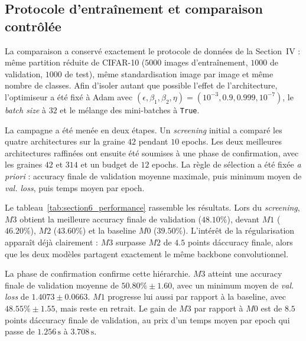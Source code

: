 \subsection{Protocole d'entra\^inement et comparaison contr\^ol\'ee}
La comparaison a conserv\'e exactement le protocole de donn\'ees de la Section~IV : m\^eme partition r\'eduite de CIFAR-10 ($5000$ images d'entra\^inement, $1000$ de validation, $1000$ de test), m\^eme standardisation image par image et m\^eme nombre de classes. Afin d'isoler autant que possible l'effet de l'architecture, l'optimiseur a \'et\'e fix\'e \`a Adam avec $(\epsilon,\beta_1,\beta_2,\eta)=(10^{-3},0.9,0.999,10^{-7})$, le \textit{batch size} \`a $32$ et le m\'elange des mini-batches \`a \texttt{True}.

La campagne a \'et\'e men\'ee en deux \'etapes. Un \textit{screening} initial a compar\'e les quatre architectures sur la graine $42$ pendant $10$ epochs. Les deux meilleures architectures raffin\'ees ont ensuite \'et\'e soumises \`a une phase de confirmation, avec les graines $42$ et $314$ et un budget de $12$ epochs. La r\`egle de s\'election a \'et\'e fix\'ee \textit{a priori} : accuracy finale de validation moyenne maximale, puis minimum moyen de \textit{val. loss}, puis temps moyen par epoch.

Le tableau~\ref{tab:section6_performance} rassemble les r\'esultats. Lors du \textit{screening}, $M3$ obtient la meilleure accuracy finale de validation ($48.10\%$), devant $M1$ ($46.20\%$), $M2$ ($43.60\%$) et la baseline $M0$ ($39.50\%$). L'int\'er\^et de la r\'egularisation appara\^it d\'ej\`a clairement : $M3$ surpasse $M2$ de $4.5$ points d\'accuracy finale, alors que les deux mod\`eles partagent exactement le m\^eme backbone convolutionnel.

La phase de confirmation confirme cette hi\'erarchie. $M3$ atteint une accuracy finale de validation moyenne de $50.80\% \pm 1.60$, avec un minimum moyen de \textit{val. loss} de $1.4073 \pm 0.0663$. $M1$ progresse lui aussi par rapport \`a la baseline, avec $48.55\% \pm 1.55$, mais reste en retrait. Le gain de $M3$ par rapport \`a $M0$ est de $8.5$ points d\'accuracy finale de validation, au prix d'un temps moyen par epoch qui passe de $1.256\,\mathrm{s}$ \`a $3.708\,\mathrm{s}$.

